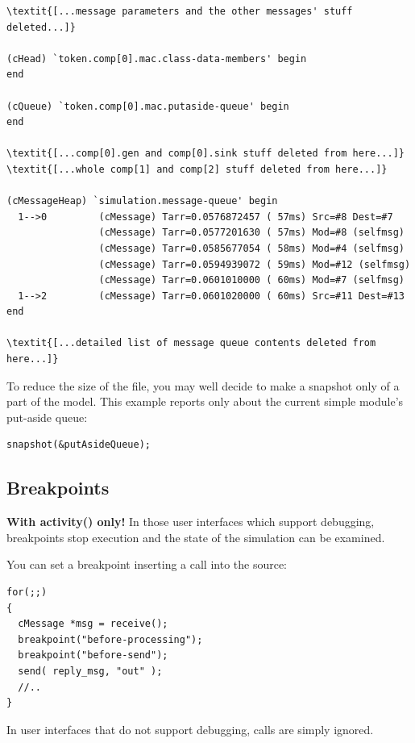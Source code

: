 \begin{Verbatim}[commandchars=\\\{\}]
\textit{[...message parameters and the other messages' stuff deleted...]}

(cHead) `token.comp[0].mac.class-data-members' begin
end

(cQueue) `token.comp[0].mac.putaside-queue' begin
end

\textit{[...comp[0].gen and comp[0].sink stuff deleted from here...]}
\textit{[...whole comp[1] and comp[2] stuff deleted from here...]}

(cMessageHeap) `simulation.message-queue' begin
  1-->0         (cMessage) Tarr=0.0576872457 ( 57ms) Src=#8 Dest=#7
                (cMessage) Tarr=0.0577201630 ( 57ms) Mod=#8 (selfmsg)
                (cMessage) Tarr=0.0585677054 ( 58ms) Mod=#4 (selfmsg)
                (cMessage) Tarr=0.0594939072 ( 59ms) Mod=#12 (selfmsg)
                (cMessage) Tarr=0.0601010000 ( 60ms) Mod=#7 (selfmsg)
  1-->2         (cMessage) Tarr=0.0601020000 ( 60ms) Src=#11 Dest=#13
end

\textit{[...detailed list of message queue contents deleted from here...]}
\end{Verbatim}

To reduce the size of the file, you may well decide to make a snapshot
only of a part of the model. This example
reports only about the current simple module's put-aside queue:

\begin{verbatim}
snapshot(&putAsideQueue);
\end{verbatim}





\subsection{Breakpoints}

\textbf{With activity() only!} In those user interfaces which support
debugging, breakpoints stop execution and the state of the simulation
can be examined.

You can set a breakpoint inserting a
 call into the source:

\begin{verbatim}
for(;;)
{
  cMessage *msg = receive();
  breakpoint("before-processing");
  breakpoint("before-send");
  send( reply_msg, "out" );
  //..
}
\end{verbatim}


In user interfaces that do not support debugging, 
calls are simply ignored.





